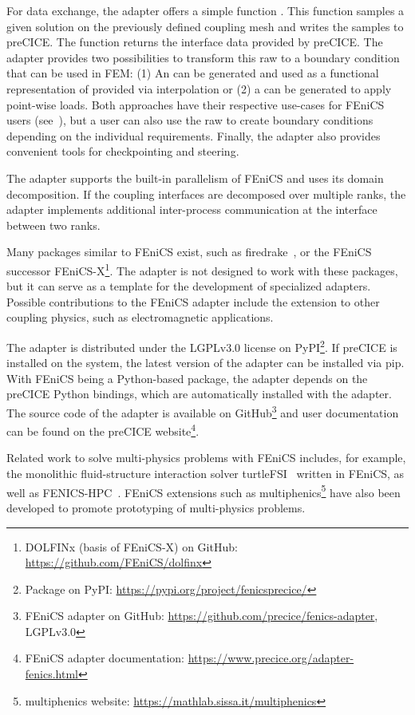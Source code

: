 For data exchange, the adapter offers a simple function . This function samples a given solution on the previously defined coupling mesh and writes the samples to preCICE. The function  returns the interface data provided by preCICE. The adapter provides two possibilities to transform this raw  to a boundary condition that can be used in FEM: (1) An  can be generated and used as a functional representation of provided  via interpolation or (2) a  can be generated to apply point-wise loads. Both approaches have their respective use-cases for FEniCS users (see~\cite{rodenberg2021fenicsprecice}), but a user can also use the raw  to create boundary conditions depending on the individual requirements. Finally, the adapter also provides convenient tools for checkpointing and steering.

The adapter supports the built-in parallelism of FEniCS and uses its domain decomposition. If the coupling interfaces are decomposed over multiple ranks, the adapter implements additional inter-process communication at the interface between two ranks.

Many packages similar to FEniCS exist, such as firedrake~\cite{Rathgeber2016}, or the FEniCS successor \mbox{FEniCS-X}\footnote{DOLFINx (basis of FEniCS-X) on GitHub: \url{https://github.com/FEniCS/dolfinx}}. The adapter is not designed to work with these packages, but it can serve as a template for the development of specialized adapters. Possible contributions to the FEniCS adapter include the extension to other coupling physics, such as electromagnetic applications.

The adapter is distributed under the LGPLv3.0 license on PyPI\footnote{Package  on PyPI: \url{https://pypi.org/project/fenicsprecice/}}. If preCICE is installed on the system, the latest version of the adapter can be installed via pip. With FEniCS being a Python-based package, the adapter depends on the preCICE Python bindings, which are automatically installed with the adapter. The source code of the adapter is available on GitHub\footnote{FEniCS adapter on GitHub: \url{https://github.com/precice/fenics-adapter}, LGPLv3.0} and user documentation can be found on the preCICE website\footnote{FEniCS adapter documentation: \url{https://www.precice.org/adapter-fenics.html}}.

Related work to solve multi-physics problems with FEniCS includes, for example, the monolithic fluid-structure interaction solver turtleFSI~\cite{Bergersen2020} written in FEniCS, as well as \mbox{FENICS-HPC}~\cite{FENICS-HPC}. FEniCS extensions such as multiphenics\footnote{multiphenics website: \url{https://mathlab.sissa.it/multiphenics}} have also been developed to promote prototyping of multi-physics problems.

